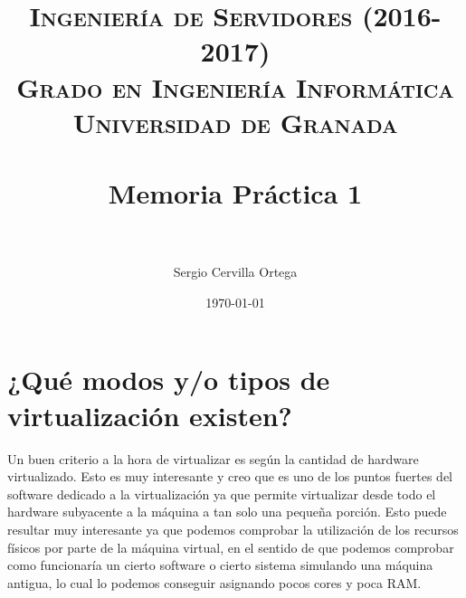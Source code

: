 

\usepackage[sfdefault]{roboto}
\usepackage{sectsty}
\usepackage{hyperref}


\sectionfont{\fontsize{12}{15}\selectfont}
\title{	
\normalfont \normalsize 
\textsc{\textbf{Ingeniería de Servidores (2016-2017)} \\ Grado en Ingeniería Informática \\ Universidad de Granada} \\ [25pt] %
\horrule{0.5pt} \\[0.4cm] %
\huge Memoria Práctica 1 \\ %
\horrule{2pt} \\[0.5cm] %
}

\author{Sergio Cervilla Ortega} %

\date{\normalsize\today} %




\maketitle %

\newpage %

\section{¿Qué modos y/o tipos de virtualización existen?}

Un buen criterio a la hora de virtualizar es según la cantidad de hardware virtualizado. Esto es muy interesante y creo que es uno de los puntos fuertes del software dedicado a la virtualización ya que permite virtualizar desde todo el hardware subyacente a la máquina a tan solo una pequeña porción. Esto puede resultar muy interesante ya que podemos comprobar la utilización de los recursos físicos por parte de la máquina virtual, en el sentido de que podemos comprobar como funcionaría un cierto software o cierto sistema simulando una máquina antigua, lo cual lo podemos conseguir asignando pocos cores y poca RAM.\\

